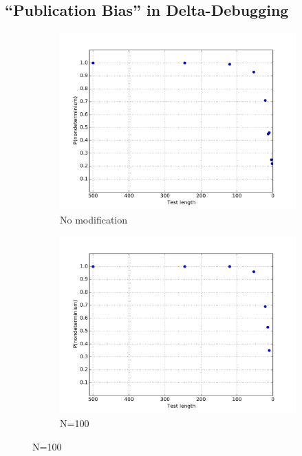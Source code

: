 \subsection{``Publication Bias'' in Delta-Debugging}
\label{sec:pubbias}

\begin{figure}
\centering 
\begin{subfigure}{0.30\columnwidth}
\centering
\includegraphics[width=\columnwidth]{lengthddmin}
\caption{No modification}
\label{fig:p1}
\end{subfigure}
\begin{subfigure}{0.30\columnwidth}
\centering
\includegraphics[width=\columnwidth]{lengthddminforcep}
\caption{N=100}
\label{fig:p2}

\end{subfigure}
\end{figure}

